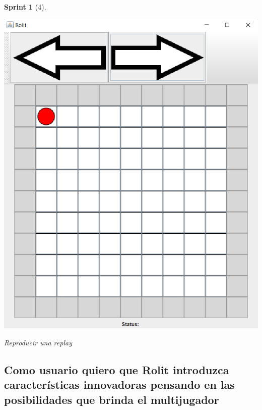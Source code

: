 \documentclass{article}
\theoremstyle{break}
\newtheorem*{sprint}{Sprint}
\begin{document}
\begin{sprint}[4]
\begin{center}
\includegraphics[scale=0.9]{replay-sprint3.png}

Reproducir una replay
\end{center}


\end{sprint}

\subsection{Como usuario quiero que Rolit introduzca características innovadoras pensando en las posibilidades que brinda el multijugador}
\end{document}
